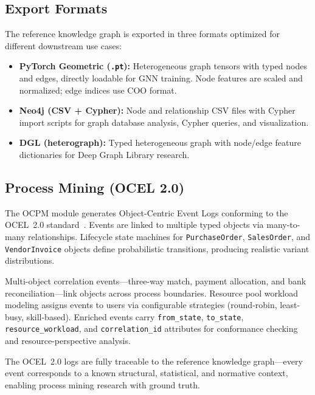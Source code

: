 \subsection{Export Formats}
\label{sec:kg_export}

The reference knowledge graph is exported in three formats optimized for
different downstream use cases:

\begin{itemize}
  \item \textbf{PyTorch Geometric (\texttt{.pt}):} Heterogeneous graph
    tensors with typed nodes and edges, directly loadable for GNN
    training.  Node features are scaled and normalized; edge indices
    use COO format.
  \item \textbf{Neo4j (CSV + Cypher):} Node and relationship CSV files
    with Cypher import scripts for graph database analysis, Cypher
    queries, and visualization.
  \item \textbf{DGL (heterograph):} Typed heterogeneous graph with
    node/edge feature dictionaries for Deep Graph Library research.
\end{itemize}

\subsection{Process Mining (OCEL 2.0)}
\label{sec:kg_ocel}

The OCPM module generates Object-Centric Event Logs conforming to the
OCEL~2.0 standard~\citep{ghahfarokhi2021ocel}.  Events are linked to
multiple typed objects via many-to-many relationships.  Lifecycle state
machines for \texttt{PurchaseOrder}, \texttt{SalesOrder}, and
\texttt{VendorInvoice} objects define probabilistic transitions,
producing realistic variant distributions.

Multi-object correlation events---three-way match, payment allocation,
and bank reconciliation---link objects across process boundaries.
Resource pool workload modeling assigns events to users via configurable
strategies (round-robin, least-busy, skill-based).  Enriched events
carry \texttt{from\_state}, \texttt{to\_state},
\texttt{resource\_workload}, and \texttt{correlation\_id} attributes
for conformance checking and resource-perspective analysis.

The OCEL~2.0 logs are fully traceable to the reference knowledge
graph---every event corresponds to a known structural, statistical,
and normative context, enabling process mining research with ground
truth.


